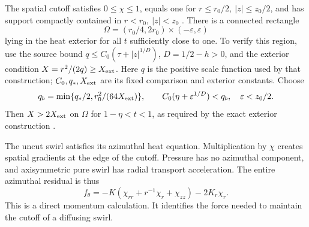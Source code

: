 The spatial cutoff satisfies \(0\le\chi\le1\), equals one for
\(r\le r_0/2,\ |z|\le z_0/2\), and has support compactly contained
in \(r<r_0,\ |z|<z_0\)
\cite[Section~10, (10.3)--(10.5)]{openai-paper}.
There is a connected rectangle
\[
 \Omega=(r_0/4,2r_0)\times(-\varepsilon,\varepsilon)
\]
lying in the heat exterior for all \(t\) sufficiently close to one.
To verify this region, use the source bound
\(q\le C_0(\tau+|z|^{1/D})\), \(D=1/2-h>0\), and
the exterior condition \(X=r^2/(2q)\ge X_{\rm ext}\).
Here \(q\) is the positive scale function used by that construction;
\(C_0,q_*,X_{\rm ext}\) are its fixed comparison and exterior constants.
Choose
\[
 q_b=\min\{q_*/2,r_0^2/(64X_{\rm ext})\},\qquad
 C_0(\eta+\varepsilon^{1/D})<q_b,\quad
 \varepsilon<z_0/2.
\]
Then \(X>2X_{\rm ext}\) on \(\Omega\) for \(1-\eta<t<1\),
as required by the exact exterior construction
\cite[Section~10, Step~4, p.~116]{openai-paper}.

The uncut swirl satisfies its azimuthal heat equation. Multiplication
by \(\chi\) creates spatial gradients at the edge of the cutoff.
Pressure has no azimuthal component, and axisymmetric pure swirl has
radial transport acceleration. The entire azimuthal residual is thus
\begin{equation}
 f_\theta=-K(\chi_{rr}+r^{-1}\chi_r+\chi_{zz})-2K_r\chi_r.
 \label{r:eq:cutoff-force}
\end{equation}
This is a direct momentum calculation. It identifies the force needed
to maintain the cutoff of a diffusing swirl.

